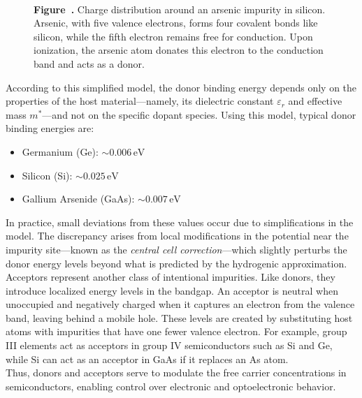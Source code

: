 \begin{figure}[h!]
\begin{minipage}{0.52\textwidth}
		\\[0.5em]
		\textbf{Figure~\thefigure.} \small Charge distribution around an arsenic impurity in silicon. Arsenic, with five valence electrons, forms four covalent bonds like silicon, while the fifth electron remains free for conduction. Upon ionization, the arsenic atom donates this electron to the conduction band and acts as a donor.
		\label{fig:SiAs}
	\end{minipage}
\end{figure}
According to this simplified model, the donor binding energy depends only on the properties of the host material—namely, its dielectric constant \( \varepsilon_r \) and effective mass \( m^* \)—and not on the specific dopant species. Using this model, typical donor binding energies are:
\begin{itemize}
	\item Germanium (Ge): \( \sim 0.006\,\text{eV} \)
	\item Silicon (Si): \( \sim 0.025\,\text{eV} \)
	\item Gallium Arsenide (GaAs): \( \sim 0.007\,\text{eV} \)
\end{itemize}
In practice, small deviations from these values occur due to simplifications in the model. The discrepancy arises from local modifications in the potential near the impurity site—known as the \textit{central cell correction}—which slightly perturbs the donor energy levels beyond what is predicted by the hydrogenic approximation.\\
Acceptors represent another class of intentional impurities. Like donors, they introduce localized energy levels in the bandgap. An acceptor is neutral when unoccupied and negatively charged when it captures an electron from the valence band, leaving behind a mobile hole. These levels are created by substituting host atoms with impurities that have one fewer valence electron. For example, group III elements act as acceptors in group IV semiconductors such as Si and Ge, while Si can act as an acceptor in GaAs if it replaces an As atom.\\
Thus, donors and acceptors serve to modulate the free carrier concentrations in semiconductors, enabling control over electronic and optoelectronic behavior.


